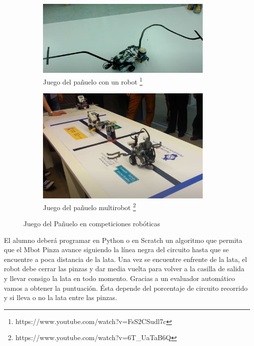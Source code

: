 \begin{figure}[H]
  \begin{subfigure}[b]{0.5\textwidth}
  \centering
    \includegraphics[width=0.95\textwidth, height=0.4\textwidth]{chapters/images/jp.png}
    \caption{Juego del pañuelo con un robot \footnote{https://www.youtube.com/watch?v=FsS2CSudl7c}}
    \label{fig:f1}
  \end{subfigure}
  \hfill
  \begin{subfigure}[b]{0.5\textwidth}
  \centering
    \includegraphics[width=0.95\textwidth, height=0.4\textwidth]{chapters/images/jp2.png}
    \caption{Juego del pañuelo multirobot \footnote{https://www.youtube.com/watch?v=6T\_Ua\-TaB6Q}}
    \label{fig:f2}
  \end{subfigure}
  \caption{Juego del Pañuelo en competiciones robóticas}

\end{figure}

 
El alumno deberá programar en Python o en Scratch un algoritmo que permita que el Mbot Pinza avance siguiendo la línea negra del circuito hasta que se encuentre a poca distancia de la lata. Una vez se encuentre enfrente de la lata, el robot debe cerrar las pinzas y dar media vuelta para volver a la casilla de salida y  llevar consigo la lata en todo momento. Gracias a un evaluador automático vamos a obtener la puntuación. Ésta depende del porcentaje de circuito recorrido y si lleva o no la lata entre las pinzas.

